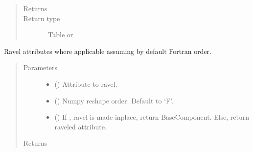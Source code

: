 \documentclass[letterpaper,10pt,english]{sphinxmanual}
\begin{document}
\begin{fulllineitems}
\begin{fulllineitems}
\begin{quote}
\begin{description}
\begin{itemize}
\end{itemize}

\item[{Returns}] \leavevmode
{}

\item[{Return type}] \leavevmode
\_Table or 

\end{description}\end{quote}

\end{fulllineitems}


\begin{fulllineitems}
\label{\detokenize{api/tables:geology.src.Tables.ravel}}
Ravel attributes where applicable assuming by default Fortran order.
\begin{quote}\begin{description}
\item[{Parameters}] \leavevmode\begin{itemize}
\item {} 
 (\sphinxstyleliteralemphasis{\sphinxupquote{, }}) \textendash{} Attribute to ravel.

\item {} 
 () \textendash{} Numpy reshape order. Default to ‘F’.

\item {} 
 () \textendash{} If , ravel is made inplace, return BaseComponent.
Else, return raveled attribute.

\end{itemize}

\item[{Returns}] \leavevmode
{}


\end{description}
\end{quote}
\end{fulllineitems}
\end{fulllineitems}
\end{document}

